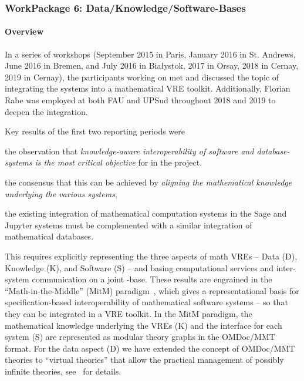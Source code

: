 \subsubsection{WorkPackage 6:  Data/Knowledge/Software-Bases}\label{dksbases}

\paragraph{Overview}

In a series of workshops (September 2015 in Paris, January 2016 in St. Andrews, June 2016 in Bremen, and July 2016 in Bia{\l}ystok, 2017 in Orsay, 2018 in Cernay, 2019 in Cernay), the participants working on  met and discussed the topic of integrating the \pn systems into a mathematical VRE toolkit.
Additionally, Florian Rabe was employed at both FAU and UPSud throughout 2018 and 2019 to deepen the integration.

Key results of the first two reporting periods were
\begin{compactitem}[\bf R1.]
\item the observation that \emph{knowledge-aware interoperability of software and database-systems is the most critical objective} for  in the \pn project.
\item the consensus that this can be achieved by \emph{aligning the mathematical knowledge underlying the various systems},
\item the existing integration of mathematical computation systems in the Sage and Jupyter systems must be complemented with a similar integration of mathematical databases.
\end{compactitem}
This requires explicitly representing the three aspects of math VREs -- Data (D), Knowledge (K), and Software (S) -- and basing computational services and inter-system communication on a joint \DKS-base.
These results are engrained in the ``Math-in-the-Middle'' (MitM) paradigm~\cite{DehKohKon:iop16}, which gives a representational basis for specification-based interoperability of mathematical software systems -- so that they can be integrated in a VRE toolkit.
In the MitM paradigm, the mathematical knowledge underlying the VREs (K) and the interface for each system (S) are represented as modular theory graphs in the OMDoc/MMT format.
For the data aspect (D) we have extended the concept of OMDoc/MMT theories to ``virtual theories'' that allow the practical management of possibly infinite theories, see~\cite{ODK-D6.5} for details.

